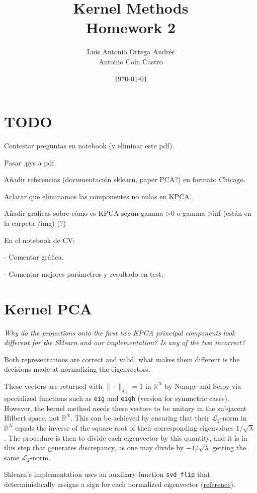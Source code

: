 \documentclass[11pt]{article}
\author{Luis Antonio Ortega Andrés\\Antonio Coín Castro}
\date{\today}
\title{Kernel Methods\\\medskip
\large Homework 2}
\begin{document}
\maketitle

\section{TODO}

Contestar preguntas en notebook (y eliminar este pdf).

Pasar .pys a pdf.

Añadir referencias (documentación sklearn, paper PCA?) en formato Chicago.

Aclarar que eliminamos las componentes no nulas en KPCA.

Añadir gráficas sobre cómo es KPCA según gamma->0 o gamma->inf (están en la carpeta /img) (?)

En el notebook de CV:

- Comentar gráfica.

- Comentar mejores parámetros y resultado en test.

\section*{Kernel PCA}

\emph{Why do the projections onto the first two KPCA principal components look different for the Sklearn and our implementation? Is any of the two incorrect?}

Both representations are correct and valid, what makes them different is the decisions made at normalizing the eigenvectors.

These vectors are returned with \(\|\cdot \|_{\mathcal{L}_2} = 1\) in \( \mathbb{R}^N \)  by Numpy and Scipy via specialized functions such as \texttt{eig} and \texttt{eigh} (version for symmetric cases). However, the kernel method needs these vectors to be unitary in the subjacent Hilbert space, not \( \mathbb{R}^N \). This can be achieved by ensuring that their \( \mathcal{L}_2 \)-norm in \( \mathbb{R}^N \)  equals the inverse of the square root of their corresponding eigenvalues \( 1/\sqrt{\lambda} \) . The procedure is then to divide each eigenvector by this quantity, and it is in this step that generates discrepancy, as one may divide by \( -1/\sqrt{\lambda} \) getting the same \( \mathcal{L}_2 \)-norm.

Sklearn's implementation uses an auxiliary function \texttt{svd\_flip} that deterministically assigns a sign for each normalized eigenvector (\href{https://github.com/scikit-learn/scikit-learn/blob/15c2c72e27c6ea18566f4e786506c7a3aef8a5de/sklearn/utils/extmath.py#L504}{reference}).
\end{document}
